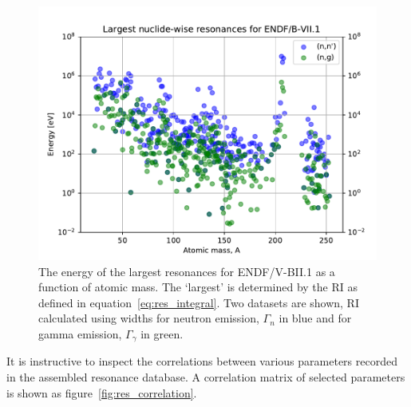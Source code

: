 \begin{figure}[H]
  \centering
  \includegraphics[width=\linewidth]{largest_res_energy_scatter}
  \caption{The energy of the largest resonances for ENDF/V-BII.1 as a function of atomic mass. The `largest' is determined by the RI as defined in equation~\ref{eq:res_integral}. Two datasets are shown, RI calculated using widths for neutron emission, $\Gamma_{n}$ in blue and for gamma emission, $\Gamma_{\gamma}$ in green.}
  \label{fig:largest_res_energy_scatter}
\end{figure}

It is instructive to inspect the correlations between various parameters recorded in the assembled resonance database. A correlation matrix of selected parameters is shown as figure~\ref{fig:res_correlation}. 

